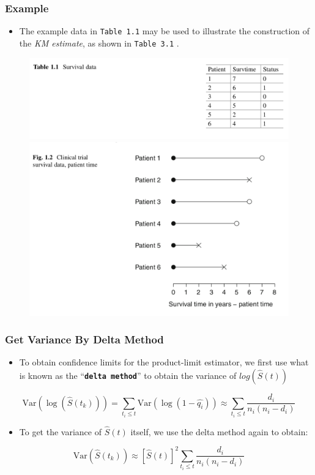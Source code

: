 \documentclass{beamer}
\newcommand{\empr}[1]{{\emph{\color{red}#1}}}
\newcommand{\pkg}[1]{{\textbf{\texttt{#1}}}}
\newcommand{\Var}{\mathrm{Var}}%
\begin{document}
\pagebreak
\begin{frame}
\frametitle{Example}
\begin{itemize}
\item The example data in \texttt{Table 1.1} may be used to illustrate the construction of the \empr{KM estimate}, as shown in \texttt{Table 3.1} .	
\end{itemize}
\begin{figure}[t]
	\includegraphics[scale = .3]{001.png}
	\includegraphics[scale = .3]{002.png}
\end{figure}
\end{frame}

\pagebreak
\begin{frame}
\frametitle{Get Variance By Delta Method}
\begin{itemize}
\item To obtain confidence limits for the product-limit estimator, we first use what is known as the ``\pkg{delta method}''  to obtain the variance of $log(\hat{S}(t))$
\end{itemize}
\begin{equation}
\Var(\log(\hat{S}(t_k))) = \sum\limits_{t_i\le t}^{}\Var(\log(1-\hat{q_i}))\approx \sum\limits_{t_i\le t}^{} \frac{d_i}{n_i(n_i -d_i)}
\end{equation}

\begin{itemize}
\item To get the variance of $\hat{S}(t)$ itself, we use the delta method again to obtain:
\end{itemize}
\begin{equation}
\Var(\hat{S}(t_k))\approx [\hat{S}(t)]^{2} \sum\limits_{t_i\le t}^{} \frac{d_i}{n_i(n_i -d_i)}
\end{equation}
\end{frame}
\end{document}
